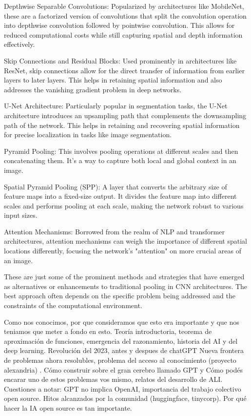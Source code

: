     Depthwise Separable Convolutions: Popularized by architectures like MobileNet, these are a factorized version of convolutions that split the convolution operation into depthwise convolution followed by pointwise convolution. This allows for reduced computational costs while still capturing spatial and depth information effectively.

    Skip Connections and Residual Blocks: Used prominently in architectures like ResNet, skip connections allow for the direct transfer of information from earlier layers to later layers. This helps in retaining spatial information and also addresses the vanishing gradient problem in deep networks.

    U-Net Architecture: Particularly popular in segmentation tasks, the U-Net architecture introduces an upsampling path that complements the downsampling path of the network. This helps in retaining and recovering spatial information for precise localization in tasks like image segmentation.

    Pyramid Pooling: This involves pooling operations at different scales and then concatenating them. It's a way to capture both local and global context in an image.

    Spatial Pyramid Pooling (SPP): A layer that converts the arbitrary size of feature maps into a fixed-size output. It divides the feature map into different scales and performs pooling at each scale, making the network robust to various input sizes.

    Attention Mechanisms: Borrowed from the realm of NLP and transformer architectures, attention mechanisms can weigh the importance of different spatial locations differently, focusing the network's "attention" on more crucial areas of an image.

These are just some of the prominent methods and strategies that have emerged as alternatives or enhancements to traditional pooling in CNN architectures. The best approach often depends on the specific problem being addressed and the constraints of the computational environment.


















Como nos conocimos, por que consideramos que esto era importante y que nos teniamos que meter a fondo en esto.
Teoría introductoria, teorema de aproximación de funciones, emergencia del razonamiento, historia del AI y del deep learning.
Revolución del 2023, antes y despues de chatGPT
Nueva frontera de problemas ahora resolubles, problema del acceso al conocimiento (proyecto alexandria) .
Cómo construir sobre el gran cerebro llamado GPT y Cómo podés encarar uno de estos problemas vos mismo, relatos del desarrollo de ALI.
Cuestiones a notar: GPT no implica OpenAI, importancia del trabajo colectivo open source. Hitos alcanzados por la comunidad (huggingface, tinycorp). Por qué hacer la IA open source es tan importante.





